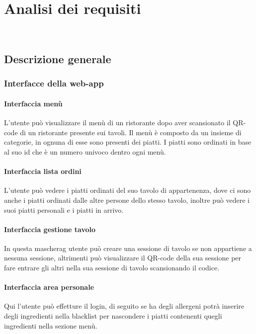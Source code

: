 
\chapter{Analisi dei requisiti}
\label{cap:analisi dei requisiti}

\\

\section{Descrizione generale}
\subsection{Interfacce della web-app}
\subsubsection{Interfaccia menù}
L'utente può visualizzare il menù di un ristorante dopo aver scansionato il QR-code di un ristorante presente sui tavoli. Il menù è composto da un insieme di categorie, in ognuna di esse sono presenti dei piatti. I piatti sono ordinati in base al suo id che è un numero univoco dentro ogni menù.
\subsubsection{Interfaccia lista ordini}
L'utente può vedere i piatti ordinati del suo tavolo di appartenenza, dove ci sono anche i piatti ordinati dalle altre persone dello stesso tavolo, inoltre può vedere i suoi piatti personali e i piatti in arrivo.
\subsubsection{Interfaccia gestione tavolo}
In questa \gls{mascherag} utente può creare una sessione di tavolo se non appartiene a nessuna sessione, altrimenti può visualizzare il QR-code della sua sessione per fare entrare gli altri nella sua sessione di tavolo scansionando il codice.
\subsubsection{Interfaccia area personale}
Qui l'utente può effetture il login, di seguito se ha degli allergeni potrà inserire degli ingredienti nella blacklist per nascondere i piatti contenenti quegli ingredienti nella sezione menù.
